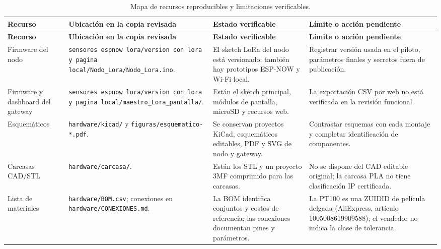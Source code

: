 \begingroup
\small\singlespacing
\setlength{\tabcolsep}{3pt}
\begin{longtable}{@{}>{\raggedright\arraybackslash}p{2.4cm}>{\raggedright\arraybackslash}p{4.9cm}>{\raggedright\arraybackslash}p{3.9cm}>{\raggedright\arraybackslash}p{3.4cm}@{}}
\caption{Mapa de recursos reproducibles y limitaciones verificables.}\label{tab:anexos-reproducibilidad}\\
\toprule
\textbf{Recurso} & \textbf{Ubicación en la copia revisada} & \textbf{Estado verificable} & \textbf{Límite o acción pendiente} \\
\midrule\endfirsthead
\toprule
\textbf{Recurso} & \textbf{Ubicación en la copia revisada} & \textbf{Estado verificable} & \textbf{Límite o acción pendiente} \\
\midrule\endhead
\bottomrule\endfoot
Firmware del nodo & \texttt{sensores espnow lora/}\linebreak\texttt{version con lora y pagina local/}\linebreak\texttt{Nodo\_Lora/Nodo\_Lora.ino}. & El sketch LoRa del nodo está versionado; también hay prototipos ESP-NOW y Wi-Fi local. & Registrar versión usada en el piloto, parámetros finales y secretos fuera de publicación. \\
Firmware y dashboard del gateway & \texttt{sensores espnow lora/}\linebreak\texttt{version con lora y pagina local/}\linebreak\texttt{maestro\_Lora\_pantalla/}. & Están el sketch principal, módulos de pantalla, microSD y recursos web. & La exportación CSV por web no está verificada en la revisión funcional. \\
Esquemáticos & \texttt{hardware/kicad/} y \texttt{figuras/esquematico-*.pdf}. & Se conservan proyectos KiCad, esquemáticos editables, PDF y SVG de nodo y gateway. & Contrastar esquemas con cada montaje y completar identificación de componentes. \\
Carcasas CAD/STL & \texttt{hardware/carcasa/}. & Están los STL y un proyecto 3MF comprimido para las carcasas. & No se dispone del CAD editable original; la carcasa PLA no tiene clasificación IP certificada. \\
Lista de materiales & \texttt{hardware/BOM.csv}; conexiones en \texttt{hardware/CONEXIONES.md}. & La BOM identifica conjuntos y costos de referencia; las conexiones documentan pines y parámetros. & La PT100 es una ZUIDID de película delgada (AliExpress, artículo 1005008619909588); el vendedor no indica la clase de tolerancia. \\

\end{longtable}
